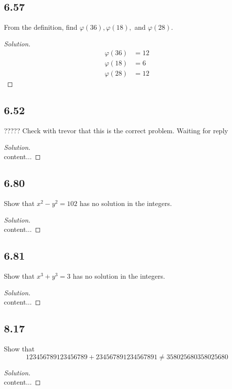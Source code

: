 \documentclass[]{article}
\let\phi\varphi
\newcommand\<{\langle}
\renewcommand\>{\rangle}
\newenvironment{solution}
{
	\begin{proof}[Solution] \text{ }
		\\
	}
	{
	\end{proof}
}
\begin{document}
\subsection*{6.57} From the definition, find $\phi(36), \phi(18),$ and $\phi(28)$.
\begin{solution}
	\begin{align*}
		\phi(36) &= 12 \\
		\phi(18) &= 6 \\
		\phi(28) &= 12
	\end{align*}
\end{solution}

\subsection*{6.52} ????? Check with trevor that this is the correct problem. Waiting for reply
\begin{solution}
	content...
\end{solution}

\subsection*{6.80} Show that $x^2 - y^2 = 102$ has no solution in the integers.
\begin{solution}
	content...
\end{solution}

\subsection*{6.81} Show that $x^3 + y^3 = 3$ has no solution in the integers.
\begin{solution}
	content...
\end{solution}

\subsection*{8.17} Show that
$$
	123456789123456789 + 234567891234567891 \neq 358025680358025680
$$
\begin{solution}
	content...
\end{solution}
\end{document}
